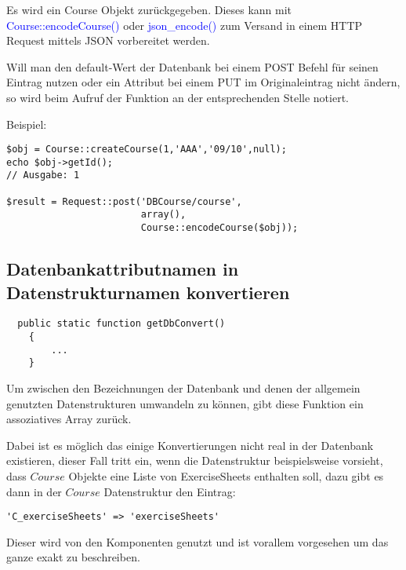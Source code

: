Es wird ein Course Objekt zurückgegeben. Dieses kann mit \textcolor{blue}{Course::encodeCourse()} oder \textcolor{blue}{json\_encode()} zum Versand in einem HTTP Request mittels JSON vorbereitet werden.

Will man den default-Wert der Datenbank bei einem POST Befehl für seinen Eintrag nutzen oder ein Attribut bei einem PUT im Originaleintrag nicht ändern, so wird beim Aufruf der  Funktion an der entsprechenden Stelle  notiert. 

\begin{minipage}{\textwidth}
Beispiel:
\begin{lstlisting}
$obj = Course::createCourse(1,'AAA','09/10',null);
echo $obj->getId();
// Ausgabe: 1

$result = Request::post('DBCourse/course',
                        array(),
                        Course::encodeCourse($obj));
\end{lstlisting}
\end{minipage}

\subsection{Datenbankattributnamen in Datenstrukturnamen konvertieren}
\begin{minipage}{\textwidth}
\begin{lstlisting}
  public static function getDbConvert()
    {
    	...
    }
\end{lstlisting}
\end{minipage}

Um zwischen den Bezeichnungen der Datenbank und denen der allgemein genutzten Datenstrukturen umwandeln zu können, gibt diese Funktion ein assoziatives Array zurück. 

Dabei ist es möglich das einige Konvertierungen nicht real in der Datenbank existieren, dieser Fall tritt ein, wenn die Datenstruktur beispielsweise vorsieht, dass $Course$ Objekte eine Liste von ExerciseSheets enthalten soll, dazu gibt es dann in der $Course$ Datenstruktur den Eintrag:
 
\begin{minipage}{\textwidth}
\begin{lstlisting}
'C_exerciseSheets' => 'exerciseSheets'
\end{lstlisting}
\end{minipage}

Dieser wird von den Komponenten genutzt und ist vorallem vorgesehen um das ganze exakt zu beschreiben.


